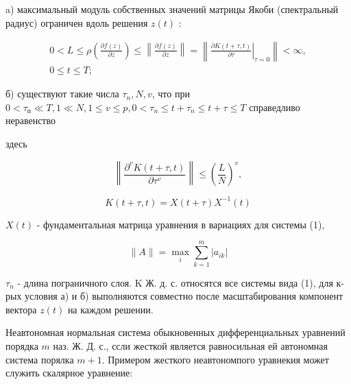 \documentclass[10pt]{article}
\begin{document}
a) максимальный модуль собственных значений матрицы Якоби (спектральный радиус) ограничен вдоль решения $z(t)$ :



\[

\begin{gathered}

0<L \leqslant \rho\left(\frac{\partial f(z)}{\partial z}\right) \leqslant\left\|\frac{\partial f(z)}{\partial z}\right\|=\left\|\left.\frac{\partial K(t+\tau, t)}{\partial \tau}\right|_{\tau=0}\right\|<\infty, \\

0 \leqslant t \leqslant T ;

\end{gathered}

\]



б) существуют такие числа $\tau_{n}, N, v$, что при $0<\tau_{п} \ll T, 1 \ll N, 1 \leqslant v \leqslant p, 0<\tau_{n} \leqslant t+\tau_{n} \leqslant t+\tau \leqslant T$ справедливо неравенство



здесь



\[

\left\|\frac{\partial^{v} K(t+\tau, t)}{\partial \tau^{v}}\right\| \leqslant\left(\frac{L}{N}\right)^{v},

\]



\[

K(t+\tau, t)=X(t+\tau) X^{-1}(t)

\]



$X(t)$ - фундаментальная матрица уравнения в вариациях для системы (1),



\[

\|A\|=\max _{i} \sum_{k=1}^{m}\left|a_{i k}\right|

\]



$\tau_{n}$ - длина пограничного слоя. $\mathrm{K}$ Ж. д. с. относятся все системы вида (1), для к-рых условия а) и б) выполняются совместно после масштабирования компонент вектора $z(t)$ на каждом решении.



Неавтономная нормальная система обыкновенных дифференциальных уравнений порядка $m$ наз. Ж. Д. с., ссли жесткой является равносильная ей автономная система порялка $m+1$. Примером жесткого неавтономпого уравнекия может служить скалярное уравнение:
\end{document}
